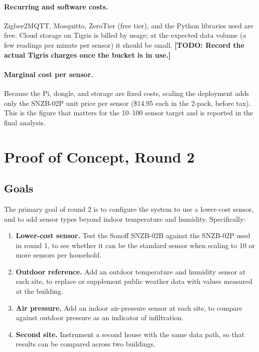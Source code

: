\documentclass[11pt,letterpaper]{article}
\newcommand{\todo}[1]{\textbf{[TODO: #1]}}
\begin{document}
\paragraph{Recurring and software costs.}
Zigbee2MQTT, Mosquitto, ZeroTier (free tier), and the Python libraries used are
free. Cloud storage on Tigris is billed by usage; at the expected data volume
(a few readings per minute per sensor) it should be small. \todo{Record the
actual Tigris charges once the bucket is in use.}

\paragraph{Marginal cost per sensor.}
Because the Pi, dongle, and storage are fixed costs, scaling the deployment adds
only the SNZB-02P unit price per sensor (\$14.95 each in the 2-pack, before tax). This is the figure that matters for the
10--100 sensor target and is reported in the final analysis.


\section{Proof of Concept, Round 2}
\label{sec:poc2}

\subsection{Goals}

The primary goal of round 2 is to configure the system to use a lower-cost
sensor, and to add sensor types beyond indoor temperature and humidity.
Specifically:
\begin{enumerate}
  \item \textbf{Lower-cost sensor.} Test the Sonoff SNZB-02B against the
    SNZB-02P used in round 1, to see whether it can be the standard sensor when
    scaling to 10 or more sensors per household.
  \item \textbf{Outdoor reference.} Add an outdoor temperature and humidity
    sensor at each site, to replace or supplement public weather data with
    values measured at the building.
  \item \textbf{Air pressure.} Add an indoor air-pressure sensor at each site,
    to compare against outdoor pressure as an indicator of infiltration.
  \item \textbf{Second site.} Instrument a second house with the same data
    path, so that results can be compared across two buildings.
\end{enumerate}
\end{document}

